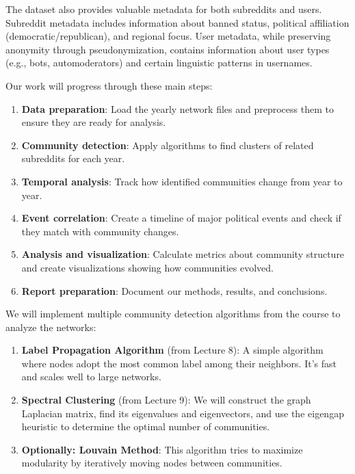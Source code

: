 \documentclass[11pt]{article}
\newcommand{\propitem}[1]{\noindent{\textbf{\color{kthblue}#1:} }}
\begin{document}
The dataset also provides valuable metadata for both subreddits and users. Subreddit metadata includes information about banned status, political affiliation (democratic/republican), and regional focus. User metadata, while preserving anonymity through pseudonymization, contains information about user types (e.g., bots, automoderators) and certain linguistic patterns in usernames.

\propitem{Work Plan} Our work will progress through these main steps:
\begin{enumerate}
    \item \textbf{Data preparation}: Load the yearly network files and preprocess them to ensure they are ready for analysis.
    \item \textbf{Community detection}: Apply algorithms to find clusters of related subreddits for each year.
    \item \textbf{Temporal analysis}: Track how identified communities change from year to year.
    \item \textbf{Event correlation}: Create a timeline of major political events and check if they match with community changes.
    \item \textbf{Analysis and visualization}: Calculate metrics about community structure and create visualizations showing how communities evolved.
    \item \textbf{Report preparation}: Document our methods, results, and conclusions.
\end{enumerate}

\propitem{Methodology} We will implement multiple community detection algorithms from the course to analyze the networks:

\begin{enumerate}
    \item \textbf{Label Propagation Algorithm} (from Lecture 8): A simple algorithm where nodes adopt the most common label among their neighbors. It's fast and scales well to large networks.
    
    \item \textbf{Spectral Clustering} (from Lecture 9): We will construct the graph Laplacian matrix, find its eigenvalues and eigenvectors, and use the eigengap heuristic to determine the optimal number of communities.
    
    \item \textbf{Optionally: Louvain Method}: This algorithm tries to maximize modularity by iteratively moving nodes between communities.
\end{enumerate}
\end{document}
